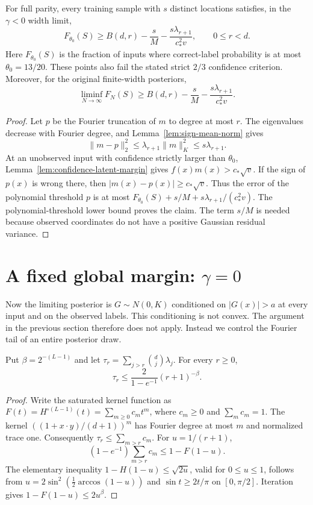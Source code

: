 \begin{theorem}
\label{thm:negative-confidence}
For full parity, every training sample with $s$ distinct locations
satisfies, in the $\gamma<0$ width limit,
\begin{equation}\label{eq:negative-confidence}
 F_{\theta_0}(S)\ge B(d,r)-\frac{s}{M}
             -\frac{s\lambda_{r+1}}{c_*^2v},
 \qquad 0\le r<d.
\end{equation}
Here $F_{\theta_0}(S)$ is the fraction of inputs where correct-label
probability is at most $\theta_0=13/20$.  These points also fail
the stated strict $2/3$ confidence criterion.  Moreover, for the
original finite-width posteriors,
\[
 \liminf_{N\to\infty}F_N(S)
 \ge B(d,r)-\frac{s}{M}
             -\frac{s\lambda_{r+1}}{c_*^2v}.
\]
\end{theorem}
\begin{proof}
Let $p$ be the Fourier truncation of $m$ to degree at most $r$.
The eigenvalues decrease with Fourier degree, and
Lemma~\ref{lem:sign-mean-norm} gives
\[
 \|m-p\|_2^2\le\lambda_{r+1}\|m\|_K^2
                    \le s\lambda_{r+1}.
\]
At an unobserved input with confidence strictly larger than $\theta_0$,
Lemma~\ref{lem:confidence-latent-margin} gives
$f(x)m(x)>c_*\sqrt v$.  If the sign of $p(x)$ is wrong there,
then $|m(x)-p(x)|\ge c_*\sqrt v$.  Thus the error of the
polynomial threshold $p$ is at most
$F_{\theta_0}(S)+s/M+s\lambda_{r+1}/(c_*^2v)$.
The polynomial-threshold lower bound proves the claim.  The term
$s/M$ is needed because observed coordinates do not have a
positive Gaussian residual variance.
\end{proof}

\section{A fixed global margin: \texorpdfstring{$\gamma=0$}{gamma = 0}}
\label{sec:zero-gamma}

Now the limiting posterior is $G\sim N(0,K)$ conditioned on
$|G(x)|>a$ at every input and on the observed labels.
This conditioning is not convex.  The argument in the previous
section therefore does not apply.  Instead we control the Fourier
tail of an entire posterior draw.

\begin{lemma}
\label{lem:tail-trace}
Put $\beta=2^{-(L-1)}$ and let
$\tau_r=\sum_{j>r}\binom dj\lambda_j$.  For every $r\ge0$,
\[
 \tau_r\le \frac{2}{1-e^{-1}}(r+1)^{-\beta}.
\]
\end{lemma}
\begin{proof}
Write the saturated kernel function as
$F(t)=H^{\circ(L-1)}(t)=\sum_{m\ge0}c_mt^m$, where $c_m\ge0$
and $\sum_m c_m=1$.  The kernel
$((1+x\cdot y)/(d+1))^m$ has Fourier degree at most $m$ and
normalized trace one.  Consequently
$\tau_r\le\sum_{m>r}c_m$.
For $u=1/(r+1)$,
\[
 (1-e^{-1})\sum_{m>r}c_m
 \le1-F(1-u).
\]
The elementary inequality
$1-H(1-u)\le\sqrt{2u}$, valid for $0\le u\le1$, follows
from $u=2\sin^2(\tfrac12\arccos(1-u))$ and
$\sin t\ge2t/\pi$ on $[0,\pi/2]$.
Iteration gives $1-F(1-u)\le2u^{\beta}$.
\end{proof}

